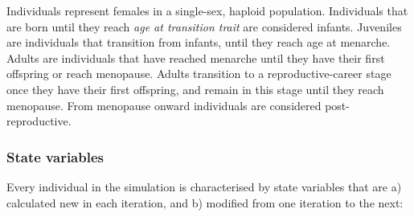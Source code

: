 \documentclass{article}
\begin{document}
Individuals represent females in a single-sex, haploid population. Individuals that are born until they reach \emph{age at transition trait} are considered infants. Juveniles are individuals that transition from infants, until they reach age at menarche. Adults are individuals that have reached menarche until they have their first offspring or reach menopause. Adults transition to a reproductive-career stage once they have their first offspring, and remain in this stage until they reach menopause. From menopause onward individuals are considered post-reproductive.

\subsubsection{State variables}

Every individual in the simulation is characterised by state variables that are a) calculated new in each iteration, and b) modified from one iteration to the next:
\end{document}
